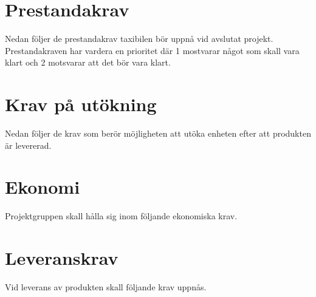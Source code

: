 \documentclass[kravspec/krav.tex]{subfiles}
\begin{document}
\section{Prestandakrav}
Nedan följer de prestandakrav taxibilen bör uppnå vid avslutat projekt.
Prestandakraven har vardera en prioritet där 1 mostvarar något som skall vara
klart och 2 motsvarar att det bör vara klart.

\begin{reqlist}
\end{reqlist}

\section{Krav på utökning}
Nedan följer de krav som berör möjligheten att utöka enheten efter att
produkten är levererad.

\begin{reqlist}
\end{reqlist}

\section{Ekonomi}
Projektgruppen skall hålla sig inom följande ekonomiska krav.

\begin{reqlist}
\end{reqlist}

\section{Leveranskrav}
Vid leverans av produkten skall följande krav uppnås.

\begin{reqlist}
\end{reqlist}
\end{document}
